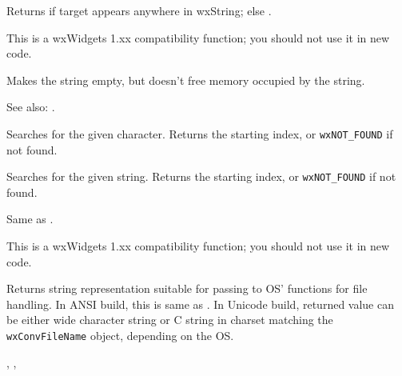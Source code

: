 Returns \true if target appears anywhere in wxString; else \false.

This is a wxWidgets 1.xx compatibility function; you should not use it in new code.


\label{wxstringempty}


Makes the string empty, but doesn't free memory occupied by the string.

See also: .


\label{wxstringfind}


Searches for the given character. Returns the starting index, or {\tt wxNOT\_FOUND} if not found.


Searches for the given string. Returns the starting index, or {\tt wxNOT\_FOUND} if not found.


\label{wxstringfirst}




Same as .

This is a wxWidgets 1.xx compatibility function; you should not use it in new code.


\label{wxstringfnstr}




Returns string representation suitable for passing to OS' functions for
file handling. In ANSI build, this is same as .
In Unicode build, returned value can be either wide character string
or C string in charset matching the {\tt wxConvFileName} object, depending on
the OS.


,
, 


